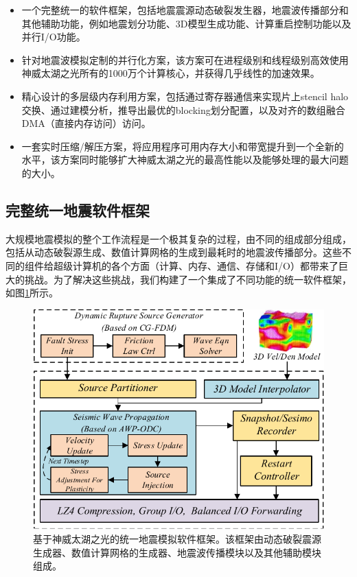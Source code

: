 \documentclass[degree=doctor]{thuthesis}
\begin{document}
\begin{itemize}
\item 一个完整统一的软件框架，包括地震震源动态破裂发生器，地震波传播部分和其他辅助功能，例如地震划分功能、3D模型生成功能、计算重启控制功能以及并行I/O功能。

\item 针对地震波模拟定制的并行化方案，该方案可在进程级别和线程级别高效使用神威太湖之光所有的1000万个计算核心，并获得几乎线性的加速效果。

\item 精心设计的多层级内存利用方案，包括通过寄存器通信来实现片上stencil halo交换、通过建模分析，推导出最优的blocking划分配置，以及对齐的数组融合DMA（直接内存访问）访问。

\item 一套实时压缩/解压方案，将应用程序可用内存大小和带宽提升到一个全新的水平，该方案同时能够扩大神威太湖之光的最高性能以及能够处理的最大问题的大小。
\end{itemize}

\subsection{完整统一地震软件框架}


大规模地震模拟的整个工作流程是一个极其复杂的过程，由不同的组成部分组成，包括从动态破裂源生成、数值计算网格的生成到最耗时的地震波传播部分。这些不同的组件给超级计算机的各个方面（计算、内存、通信、存储和I/O）都带来了巨大的挑战。为了解决这些挑战，我们构建了一个集成了不同功能的统一软件框架，如图\ref{fig:framework}所示。

\begin{figure}[h]
\centering
\includegraphics[width=0.9\columnwidth]{architecture.pdf}
\caption{基于神威太湖之光的统一地震模拟软件框架。该框架由动态破裂震源生成器、数值计算网格的生成器、地震波传播模块以及其他辅助模块组成。}
\label{fig:framework}
\end{figure}
\end{document}
